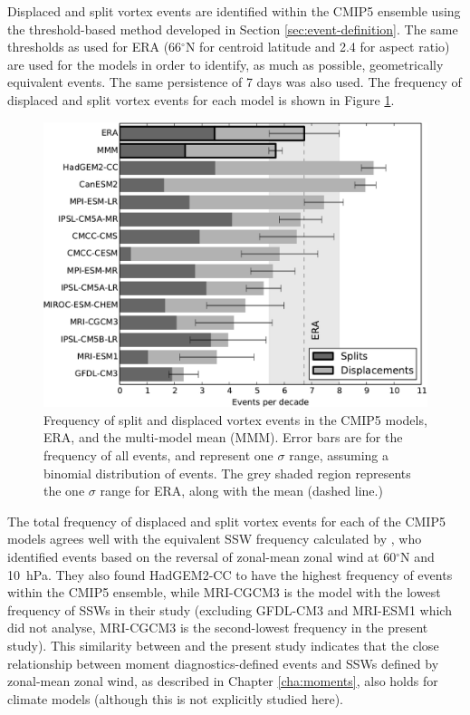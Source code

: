 Displaced and split vortex events are identified within the CMIP5 ensemble using
the threshold-based method developed in Section \ref{sec:event-definition}. The
same thresholds as used for ERA (66$^{\circ}$N for centroid latitude and 2.4 for
aspect ratio) are used for the models in order to identify, as much as possible,
geometrically equivalent events. The same persistence of 7 days was also used.
The frequency of displaced and split vortex events for each model is shown in
Figure \ref{fig:cmip5_events_bar_stacked}.

\begin{figure}
 \centering
 \noindent\includegraphics[width=\textwidth]{figures/chapter-models/events_bar_stacked.pdf}
 \caption[Frequency of split and displaced vortex events in the CMIP5
 models]{Frequency of split and displaced vortex events in the CMIP5 models,
   ERA, and the multi-model mean (MMM). Error bars are for the frequency of all
   events, and represent one $\sigma$ range, assuming a binomial distribution of
   events. The grey shaded region represents the one $\sigma$ range for ERA,
   along with the mean (dashed line.) }
 \label{fig:cmip5_events_bar_stacked}
\end{figure}

The total frequency of displaced and split vortex events for each of the CMIP5
models agrees well with the equivalent SSW frequency calculated by
\citet{Charlton-Perez2013}, who identified events based on the reversal of
zonal-mean zonal wind at 60$^{\circ}$N and 10~hPa. They also found HadGEM2-CC to
have the highest frequency of events within the CMIP5 ensemble, while MRI-CGCM3
is the model with the lowest frequency of SSWs in their study (excluding GFDL-CM3
and MRI-ESM1 which \citet{Charlton-Perez2013} did not analyse, MRI-CGCM3 is the
second-lowest frequency in the present study). This similarity between
\citet{Charlton-Perez2013} and the present study indicates that the close
relationship between moment diagnostics-defined events and SSWs defined by
zonal-mean zonal wind, as described in Chapter \ref{cha:moments}, also holds for
climate models (although this is not explicitly studied here).

